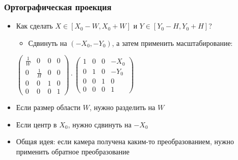\documentclass{beamer}
\begin{document}
\begin{frame}[fragile]
\frametitle{Ортографическая проекция}
\begin{itemize}
\item Как сделать \begin{math}X \in [X_0 - W, X_0 + W]\end{math} и \begin{math}Y \in [Y_0 - H, Y_0 + H]\end{math}?
\pause
\begin{itemize}
\item Сдвинуть на \begin{math}(-X_0, -Y_0)\end{math}, а затем применить масштабирование:
\end{itemize}
\begin{center}
\begin{math}
\begin{pmatrix}
\frac{1}{W} & 0 & 0 & 0 \\
0 & \frac{1}{H} & 0 & 0 \\
0 & 0 & 1 & 0 \\
0 & 0 & 0 & 1
\end{pmatrix}
\cdot
\begin{pmatrix}
1 & 0 & 0 & -X_0 \\
0 & 1 & 0 & -Y_0 \\
0 & 0 & 1 & 0 \\
0 & 0 & 0 & 1
\end{pmatrix}
\end{math}
\end{center}
\pause
\item Если размер области \begin{math}W\end{math}, нужно разделить на \begin{math}W\end{math}
\item Если центр в \begin{math}X_0\end{math}, нужно сдвинуть на \begin{math}-X_0\end{math}
\pause
\item Общая идея: если камера получена каким-то преобразованием, нужно применить обратное преобразование
\end{itemize}
\end{frame}
\end{document}
